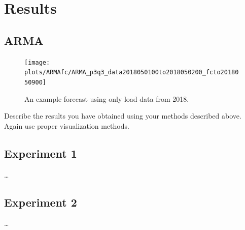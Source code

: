 \section{Results}
\label{sec:results}

\subsection{ARMA}

\begin{figure}[h!]%
\centering
\texttt{[image: plots/ARMAfc/ARMA\_p3q3\_data2018050100to2018050200\_fcto2018050900]}%
\caption{An example forecast using only load data from 2018.}%
\label{fig:arma_fc}%
\end{figure}

Describe the results you have obtained using your methods described above. Again use proper visualization methods.

\subsection{Experiment 1}

\dots

\subsection{Experiment 2}

\dots